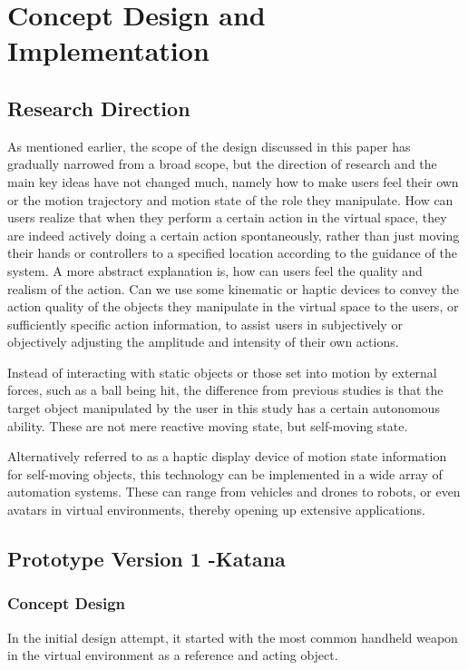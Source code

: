 \chapter{Concept Design and Implementation}
\section{Research Direction}
As mentioned earlier, the scope of the design discussed in this paper has gradually narrowed from a broad scope, but the direction of research and the main key ideas have not changed much, namely how to make users feel their own or the motion trajectory and motion state of the role they manipulate. How can users realize that when they perform a certain action in the virtual space, they are indeed actively doing a certain action spontaneously, rather than just moving their hands or controllers to a specified location according to the guidance of the system. A more abstract explanation is, how can users feel the quality and realism of the action. Can we use some kinematic or haptic devices to convey the action quality of the objects they manipulate in the virtual space to the users, or sufficiently specific action information, to assist users in subjectively or objectively adjusting the amplitude and intensity of their own actions.

Instead of interacting with static objects or those set into motion by external forces, such as a ball being hit, the difference from previous studies is that the target object manipulated by the user in this study has a certain autonomous ability. These are not mere reactive moving state, but self-moving state.

Alternatively referred to as a haptic display device of motion state information for self-moving objects, this technology can be implemented in a wide array of automation systems. These can range from vehicles and drones to robots, or even avatars in virtual environments, thereby opening up extensive applications.

\section{Prototype Version 1 -Katana}
\subsection{Concept Design}
In the initial design attempt, it started with the most common handheld weapon in the virtual environment as a reference and acting object. 

